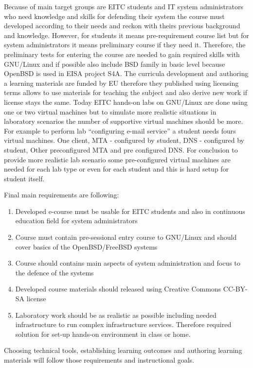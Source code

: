 Because of main target groups are \gls{EITC} students and IT system administrators who need knowledge and skills for defending their system the course must developed according to their needs and reckon with theirs previous background and knowledge. However, for students it means pre-requirement course list but for system administrators it means preliminary course if they need it. Therefore, the preliminary tests for entering the course are needed to gain required skills with GNU/Linux and if possible also include BSD family in basic level because OpenBSD is used in \gls{EISA} project S4A.
The curricula development and authoring a learning materials are funded by EU therefore they  published using licensing terms allows to use materials for teaching the subject and also derive new work if license stays the same.
Today EITC hands-on labs on GNU/Linux are done using one or two virtual machines but to simulate more realistic situations in laboratory scenarios the number of supportive virtual machines should be more. For example to perform lab “configuring e-mail service” a student needs fours virtual machines. One client, MTA - configured by student, DNS -  configured by student, Other preconfigured MTA and pre configured DNS. For conclusion to provide more realistic lab scenario some pre-configured virtual machines are needed for each lab type or even for each student and this is hard setup for student itself.

Final main requirements are following:
\begin{enumerate}[label=Requirement \arabic*.,leftmargin=*]
  \item Developed e-course must be usable for \gls{EITC} students and also in continuous education field for system administrators
  \item Course must contain pre-sessional entry course to GNU/Linux and should cover basics  of the OpenBSD/FreeBSD systems
  \item Course should contains main aspects of system administration and focus to the defence of the systems
  \item Developed course materials should released using Creative Commons \gls{CC-BY-SA} license
  \item Laboratory work should be as realistic as possible including needed infrastructure to run complex infrastructure services. Therefore required solution for set-up hands-on environment in class or home.
\end{enumerate}

Choosing technical tools, establishing learning outcomes and authoring learning materials will follow those requirements and instructional goals.

